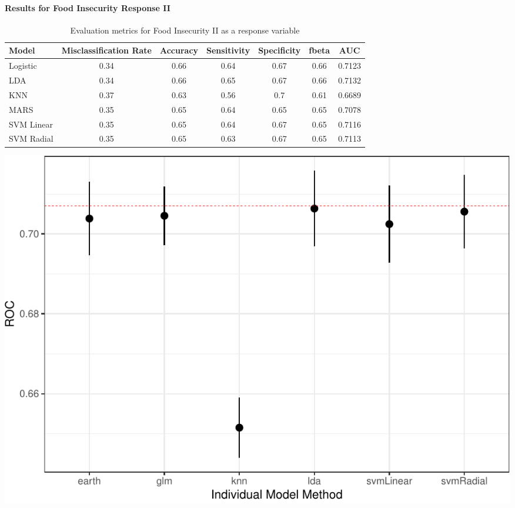 \documentclass[
  10pt,
]{article}
\begin{document}
\hypertarget{results-for-food-insecurity-response-ii}{%
\paragraph{Results for Food Insecurity Response II}\label{results-for-food-insecurity-response-ii}}

\begin{table}[H]

\caption{\label{tab:unnamed-chunk-18}Evaluation metrics for Food Insecurity II  as a response variable}
\centering
\fontsize{12}{14}\selectfont
\begin{tabular}[t]{lcccccc}
\toprule
Model & Misclassification Rate & Accuracy & Sensitivity & Specificity & fbeta & AUC\\
\midrule
Logistic & 0.34 & 0.66 & 0.64 & 0.67 & 0.66 & 0.7123\\
LDA & 0.34 & 0.66 & 0.65 & 0.67 & 0.66 & 0.7132\\
KNN & 0.37 & 0.63 & 0.56 & 0.7 & 0.61 & 0.6689\\
MARS & 0.35 & 0.65 & 0.64 & 0.65 & 0.65 & 0.7078\\
SVM Linear & 0.35 & 0.65 & 0.64 & 0.67 & 0.65 & 0.7116\\
SVM Radial & 0.35 & 0.65 & 0.63 & 0.67 & 0.65 & 0.7113\\
\bottomrule
\end{tabular}
\end{table}

\begin{center}\includegraphics{phase2_report_files/figure-latex/unnamed-chunk-19-1} \end{center}
\end{document}
